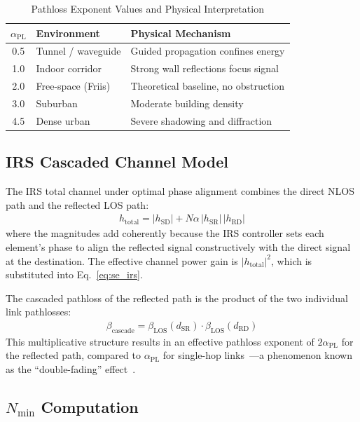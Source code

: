 \documentclass[journal]{IEEEtran} %
\begin{document}
\begin{table}[t]
\centering
\caption{Pathloss Exponent Values and Physical Interpretation}
\label{tab:pl_values}
\begin{tabular}{@{}cll@{}}
\toprule
$\alpha_{\mathrm{PL}}$ & Environment & Physical Mechanism \\
\midrule
0.5 & Tunnel / waveguide  & Guided propagation confines energy \\
1.0 & Indoor corridor     & Strong wall reflections focus signal \\
2.0 & Free-space (Friis)  & Theoretical baseline, no obstruction \\
3.0 & Suburban            & Moderate building density \\
4.5 & Dense urban         & Severe shadowing and diffraction \\
\bottomrule
\end{tabular}
\end{table}

\subsection{IRS Cascaded Channel Model}

The IRS total channel under optimal phase alignment combines the direct NLOS path and the reflected LOS path:
\begin{align}
    h_{\mathrm{total}} = |h_{\mathrm{SD}}| + N\alpha\,|h_{\mathrm{SR}}|\,|h_{\mathrm{RD}}|
    \label{eq:h_irs_total}
\end{align}
where the magnitudes add coherently because the IRS controller sets each element's phase to align the reflected signal constructively with the direct signal at the destination. The effective channel power gain is $|h_{\mathrm{total}}|^2$, which is substituted into Eq.~\eqref{eq:se_irs}.

The cascaded pathloss of the reflected path is the product of the two individual link pathlosses:
\begin{align}
    \beta_{\mathrm{cascade}} = \beta_{\mathrm{LOS}}(d_{\mathrm{SR}}) \cdot \beta_{\mathrm{LOS}}(d_{\mathrm{RD}})
    \label{eq:cascaded_pl}
\end{align}
This multiplicative structure results in an effective pathloss exponent of $2\alpha_{\mathrm{PL}}$ for the reflected path, compared to $\alpha_{\mathrm{PL}}$ for single-hop links~\cite{tang2020irs_pathloss}---a phenomenon known as the ``double-fading'' effect~\cite{basar2019wireless}.

\subsection{$N_{\mathrm{min}}$ Computation}
\end{document}
